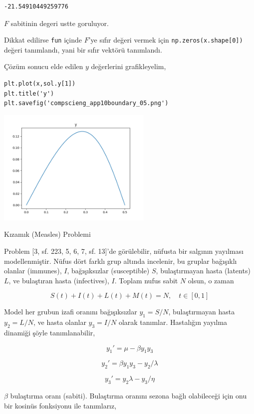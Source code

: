 \documentclass[12pt,fleqn]{article}\usepackage{../../common}
\begin{document}
\begin{verbatim}
-21.54910449259776
\end{verbatim}

$F$ sabitinin degeri ustte goruluyor. 

Dikkat edilirse \verb!fun! içinde $F$'ye sıfır değeri vermek için
\verb!np.zeros(x.shape[0])! değeri tanımlandı, yani bir sıfır vektörü
tanımlandı.

Çözüm sonucu elde edilen $y$ değerlerini grafikleyelim,

\begin{verbatim}
plt.plot(x,sol.y[1])
plt.title('y')
plt.savefig('compscieng_app10boundary_05.png')
\end{verbatim}

\includegraphics[width=20em]{compscieng_app10boundary_05.png}

Kızamık (Measles) Problemi

Problem [3, sf. 223, 5, 6, 7, sf. 13]'de görülebilir, nüfusta bir salgının
yayılması modellenmiştir. Nüfus dört farklı grup altında incelenir, bu
gruplar bağışıklı olanlar (immunes), $I$, bağışıksızlar (susceptible) $S$,
bulaştırmayan hasta (latents) $L$, ve bulaştıran hasta (infectives),
$I$. Toplam nufus sabit $N$ olsun, o zaman 

$$
S(t) + I(t) + L(t) + M(t) = N, \quad t \in [0,1]
$$

Model her grubun izafi oranını bağışıksızlar $y_1 = S/N$, bulaştırmayan
hasta $y_2 = L/N$, ve hasta olanlar $y_3 = I / N$ olarak
tanımlar. Hastalığın yayılma dinamiği şöyle tanımlanabilir, 

$$
y_1' = \mu - \beta y_1y_3
$$

$$
y_2' = \beta y_1y_3 -y_2 / \lambda
$$

$$
y_3' = y_2\lambda - y_3 / \eta
$$

$\beta$ bulaştırma oranı (sabiti). Bulaştırma oranını sezona bağlı
olabileceği için onu bir kosinüs fonksiyonu ile tanımlarız, 
\end{document}
